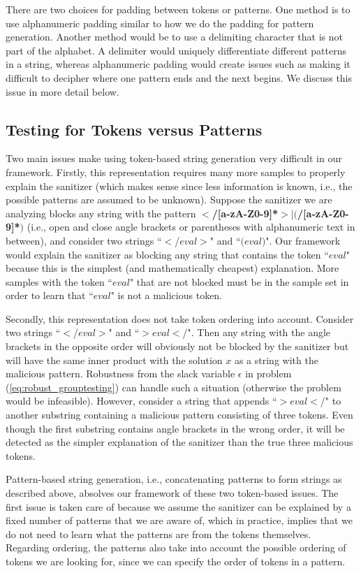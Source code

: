 There are two choices for padding between tokens or patterns. One method is to use alphanumeric padding similar to how we do the padding for pattern generation. Another method would be to use a delimiting character that is not part of the alphabet. A delimiter would uniquely differentiate different patterns in a string, whereas alphanumeric padding would create issues such as making it difficult to decipher where one pattern ends and the next begins. We discuss this issue in more detail below.

\subsection{Testing for Tokens versus Patterns}
Two main issues make using token-based string generation very difficult in our framework. Firstly, this representation requires many more samples to properly explain the sanitizer (which makes sense since less information is known, i.e., the possible patterns are assumed to be unknown). Suppose the sanitizer we are analyzing blocks any string with the pattern \textbf{$<$/[a-zA-Z0-9]*$>$$|$$($/[a-zA-Z0-9]*$)$} (i.e., open and close angle brackets or parentheses with alphanumeric text in between), and consider two strings ``$<$/$eval$$>$" and ``$($$eval$$)$". Our framework would explain the sanitizer as blocking any string that contains the token ``$eval$" because this is the simplest (and mathematically cheapest) explanation. More samples with the token ``$eval$" that are not blocked must be in the sample set in order to learn that ``$eval$" is not a malicious token.

Secondly, this representation does not take token ordering into account. Consider two strings ``$<$/$eval$$>$" and ``$>$$eval$$<$/". Then any string with the angle brackets in the opposite order will obviously not be blocked by the sanitizer but will have the same inner product with the solution $x$ as a string with the malicious pattern. Robustness from the slack variable $\epsilon$ in problem (\ref{eq:robust_grouptesting}) can handle such a situation (otherwise the problem would be infeasible). However, consider a string that appends ``$>$$eval$$<$/" to another substring containing a malicious pattern consisting of three tokens.  Even though the  first substring contains angle brackets in the wrong order, it will be detected as the simpler explanation of the sanitizer than the true three malicious tokens.

Pattern-based string generation, i.e., concatenating patterns to form strings as described above, absolves our framework of these two token-based issues. The first issue is taken care of because we assume the sanitizer can be explained by a fixed number of patterns that we are aware of, which in practice, implies that we do not need to learn what the patterns are from the tokens themselves. Regarding ordering, the patterns also take into account the possible ordering of tokens we are looking for, since we can specify the order of tokens in a pattern.

